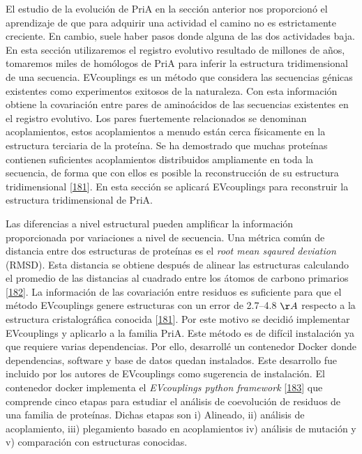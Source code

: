 \documentclass[12pt,twoside]{reedthesis}
\begin{document}
  El estudio de la evolución de PriA en la sección anterior nos
  proporcionó el aprendizaje de que para adquirir una actividad el camino
  no es estrictamente creciente. En cambio, suele haber pasos donde alguna
  de las dos actividades baja. En esta sección utilizaremos el registro
  evolutivo resultado de millones de años, tomaremos miles de homólogos de
  PriA para inferir la estructura tridimensional de una secuencia.
  EVcouplings es un método que considera las secuencias génicas existentes
  como experimentos exitosos de la naturaleza. Con esta información
  obtiene la covariación entre pares de aminoácidos de las secuencias
  existentes en el registro evolutivo. Los pares fuertemente relacionados
  se denominan acoplamientos, estos acoplamientos a menudo están cerca
  físicamente en la estructura terciaria de la proteína. Se ha demostrado
  que muchas proteínas contienen suficientes acoplamientos distribuidos
  ampliamente en toda la secuencia, de forma que con ellos es posible la
  reconstrucción de su estructura tridimensional
  {[}\protect\hyperlink{ref-marks_protein_2011}{181}{]}. En esta sección
  se aplicará EVcouplings para reconstruir la estructura tridimensional de
  PriA.
  
  Las diferencias a nivel estructural pueden amplificar la información
  proporcionada por variaciones a nivel de secuencia. Una métrica común de
  distancia entre dos estructuras de proteínas es el \emph{root mean
  sqaured deviation} (RMSD). Esta distancia se obtiene después de alinear
  las estructuras calculando el promedio de las distancias al cuadrado
  entre los átomos de carbono primarios
  {[}\protect\hyperlink{ref-kufareva_methods_2012}{182}{]}. La información
  de las covariación entre residuos es suficiente para que el método
  EVcouplings genere estructuras con un error de 2.7--4.8 \({\AA}\)
  respecto a la estructura cristalográfica conocida
  {[}\protect\hyperlink{ref-marks_protein_2011}{181}{]}. Por este motivo
  se decidió implementar EVcouplings y aplicarlo a la familia PriA. Este
  método es de difícil instalación ya que requiere varias dependencias.
  Por ello, desarrollé un contenedor Docker donde dependencias, software y
  base de datos quedan instalados. Este desarrollo fue incluido por los
  autores de EVcouplings como sugerencia de instalación. El contenedor
  docker implementa el \emph{EVcouplings python framework}
  {[}\protect\hyperlink{ref-hopf_evcouplings_2019}{183}{]} que comprende
  cinco etapas para estudiar el análisis de coevolución de residuos de una
  familia de proteínas. Dichas etapas son i) Alineado, ii) análisis de
  acoplamiento, iii) plegamiento basado en acoplamientos iv) análisis de
  mutación y v) comparación con estructuras conocidas.
  
\end{document}

